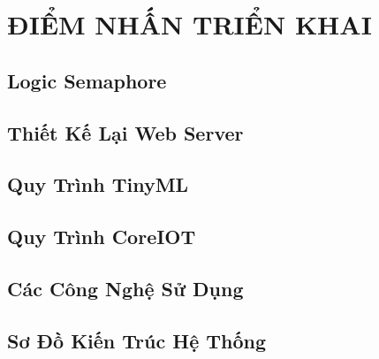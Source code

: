 \section{ĐIỂM NHẤN TRIỂN KHAI}

\subsection{Logic Semaphore}

\subsection{Thiết Kế Lại Web Server}

\subsection{Quy Trình TinyML}

\subsection{Quy Trình CoreIOT}

\subsection{Các Công Nghệ Sử Dụng}

\subsection{Sơ Đồ Kiến Trúc Hệ Thống}

\newpage